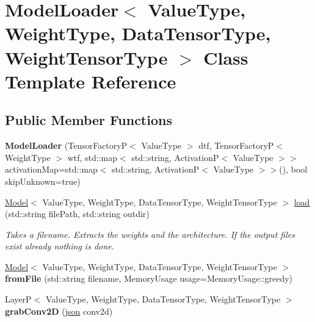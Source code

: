 \hypertarget{classModelLoader}{}\section{Model\+Loader$<$ Value\+Type, Weight\+Type, Data\+Tensor\+Type, Weight\+Tensor\+Type $>$ Class Template Reference}
\label{classModelLoader}
\subsection*{Public Member Functions}
\begin{DoxyCompactItemize}
\item 
\mbox{\label{classModelLoader_a1ddd4fb9b24a275f6a734760fc167c1b}} 
{\bfseries Model\+Loader} (Tensor\+FactoryP$<$ Value\+Type $>$ dtf, Tensor\+FactoryP$<$ Weight\+Type $>$ wtf, std\+::map$<$ std\+::string, ActivationP$<$ Value\+Type $>$$>$ activation\+Map=std\+::map$<$ std\+::string, ActivationP$<$ Value\+Type $>$$>$(), bool skip\+Unknown=true)
\item 
\hyperlink{classModel}{Model}$<$ Value\+Type, Weight\+Type, Data\+Tensor\+Type, Weight\+Tensor\+Type $>$ \hyperlink{classModelLoader_a0cf2360378b206d4ca67c082510eab44}{load} (std\+::string file\+Path, std\+::string outdir)
\begin{DoxyCompactList}\small\item\em Takes a filename. Extracts the weights and the architecture. If the output files exist already nothing is done. \end{DoxyCompactList}\item 
\mbox{\label{classModelLoader_aefba259b2d09a28cb387797641f5f359}} 
\hyperlink{classModel}{Model}$<$ Value\+Type, Weight\+Type, Data\+Tensor\+Type, Weight\+Tensor\+Type $>$ {\bfseries from\+File} (std\+::string filename, Memory\+Usage usage=Memory\+Usage\+::greedy)
\item 
\mbox{\label{classModelLoader_ab514eb7bde463092897e6fc9590abbc5}} 
LayerP$<$ Value\+Type, Weight\+Type, Data\+Tensor\+Type, Weight\+Tensor\+Type $>$ {\bfseries grab\+Conv2D} (\hyperlink{classnlohmann_1_1basic__json}{json} conv2d)
\item 
\mbox{\label{classModelLoader_ad6e29d7692f71137b217d35d68995930}} 

\end{DoxyCompactItemize}
